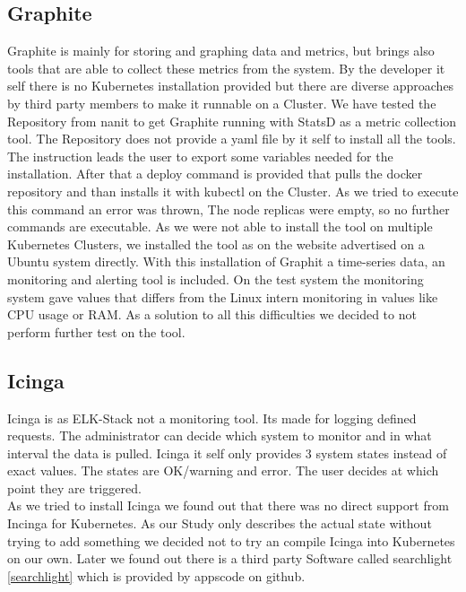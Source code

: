 \subsection{Graphite}
Graphite is mainly for storing and graphing data and metrics, but brings also tools that are able to collect these metrics from the system. By the developer it self there is no Kubernetes installation provided but there are diverse approaches by third party members to make it runnable on a Cluster. We have tested the Repository from nanit \cite{graphite} to get Graphite running with StatsD \cite{statsd} as a metric collection tool. The Repository does not provide a yaml file by it self to install all the tools. The instruction leads the user to export some variables needed for the installation. After that a deploy command is provided that pulls the docker repository and than installs it with kubectl on the Cluster. As we tried to execute this command an error was thrown, The node replicas were empty, so no further commands are executable. As we were not able to install the tool on multiple Kubernetes Clusters, we installed the tool as on the website advertised on a Ubuntu system directly. With this installation of Graphit a time-series data, an monitoring and alerting tool is included. On the test system the monitoring system gave values that differs from the Linux intern monitoring in values like CPU usage or RAM. As a solution to all this difficulties we decided to not perform further test on the tool.

\subsection{Icinga}
\label{Icinga}
Icinga is as ELK-Stack not a monitoring tool. Its made for logging defined requests. The administrator can decide which system to monitor and in what interval the data is pulled.
Icinga it self only provides 3 system states instead of exact values. The states are OK/warning and error. The user decides at which point they are triggered.\\
As we tried to install Icinga we found out that there was no direct support from Incinga for Kubernetes. As our Study only describes the actual state without trying to add something we decided not to try an compile Icinga into Kubernetes on our own. Later we found out there is a third party Software called searchlight \ref{searchlight} which is provided by appscode on github.
 